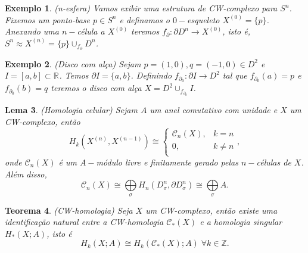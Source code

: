 \documentclass{beamer}
\newtheorem{teorema}{Teorema}[section]
\newtheorem{lema}[teorema]{Lema}
\newtheorem{exemplo}[teorema]{Exemplo}
\newcommand{\celula}[2]{D^{#1}_{#2}}
\newcommand{\homologia}[2]{H_{#1}(#2;A)}
\newcommand{\homologiarelcel}[3]{H_{#1}(D^{#2}_{#3}, \partial D^{#2}_{#3})}
\newcommand{\homologiarelskelesimpl}[2]{H_{#1}(X^{(#2)}, X^{(#2-1)})}
\newcommand{\inteiros}{\mathbb{Z}}
\newcommand{\real}[1]{\mathbb{R}^{#1}}
\newcommand{\reta}{\real{}}
\newcommand{\somadir}[1]{\bigoplus \limits_{#1}}
\newcommand{\skeleton}[1]{X^{(#1)}}
\begin{document}
\begin{frame}
	\begin{exemplo}
		(n-esfera) Vamos exibir uma estrutura de CW-complexo para $S^{n}$. Fixemos um ponto-base $p \in S^{n}$ e definamos o $0-$esqueleto $\skeleton{0}=\{p\}$. Anexando uma $n-$célula a $\skeleton{0}$ teremos $f_{\partial}: \partial D^{n} \to \skeleton{0}$, isto é, $S^{n} \approx \skeleton{n} = \{p\}\cup_{f_{\partial}} \celula{n}{}$.
	\end{exemplo}
	\begin{exemplo}
		(Disco com alça) Sejam $p=(1,0), q=(-1,0) \in D^{2}$ e $I=[a,b] \subset \reta$. Temos $\partial I=\{a,b\}$. Definindo $f_{\partial_{0}}: \partial I \to D^{2}$ tal que $f_{\partial_{0}}(a)=p$ e $f_{\partial_{0}}(b)=q$ teremos o disco com alça $X=D^{2}\cup_{f_{\partial_{0}}}I$.   
	\end{exemplo}
\end{frame}

\begin{frame}
	
	\begin{lema}
		(Homologia celular) Sejam $A$ um anel comutativo com unidade e $X$ um CW-complexo, então
		$$
		\homologiarelskelesimpl{k}{n} \cong 
		\left\{
		\begin{array}{cc}
		\mathcal{C}_{n}(X), & k = n\\
		0, & k\neq n\\
		\end{array}
		\right.,
		$$
		onde $\mathcal{C}_{n}(X)$ é um $A-$módulo livre e finitamente gerado pelas $n-$células de $X$. Além disso,
		$$
		\mathcal{C}_{n}(X) \cong \somadir{\sigma} \homologiarelcel{n}{n}{\sigma} \cong \somadir{\sigma} A.
		$$
		
	\end{lema}
\end{frame}

\begin{frame}
	\begin{teorema}
		(CW-homologia) Seja $X$ um CW-complexo, então existe uma identificação natural entre a CW-homologia $\mathcal{C}_{*}(X)$ e a homologia singular $\homologia{*}{X}$, isto é 
		$$
		\homologia{k}{X} \cong \homologia{k}{\mathcal{C}_{*}(X)}\; \forall k \in \inteiros.
		$$
	\end{teorema}
\end{frame}
\end{document}
